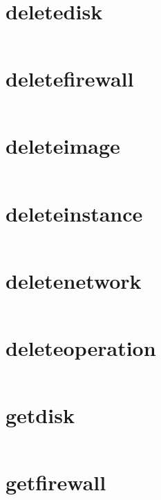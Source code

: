 \section{deletedisk}
\begin{lstlisting}[language=Bash]
\end{lstlisting}

\section{deletefirewall}
\begin{lstlisting}[language=Bash]
\end{lstlisting}

\section{deleteimage}
\begin{lstlisting}[language=Bash]
\end{lstlisting}

\section{deleteinstance}
\begin{lstlisting}[language=Bash]
\end{lstlisting}

\section{deletenetwork}
\begin{lstlisting}[language=Bash]
\end{lstlisting}

\section{deleteoperation}
\begin{lstlisting}[language=Bash]
\end{lstlisting}

\section{getdisk}
\begin{lstlisting}[language=Bash]
\end{lstlisting}

\section{getfirewall}
\begin{lstlisting}[language=Bash]
\end{lstlisting}


